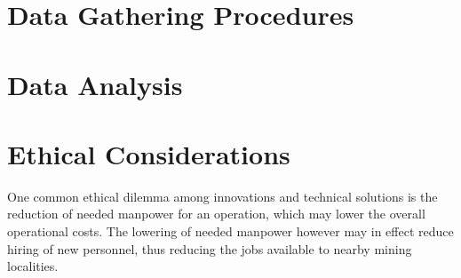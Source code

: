 \documentclass[12pt]{report}
\begin{document}
\section{Data Gathering Procedures}

\section{Data Analysis}

\section{Ethical Considerations}

One common ethical dilemma among innovations and technical solutions is the reduction of needed manpower for an operation, which may lower the overall operational costs.
The lowering of needed manpower however may in effect reduce hiring of new personnel, thus reducing the jobs available to nearby mining localities.

\printbibliography[
    title = {REFERENCES},
    heading = bibintoc
]
\end{document}
